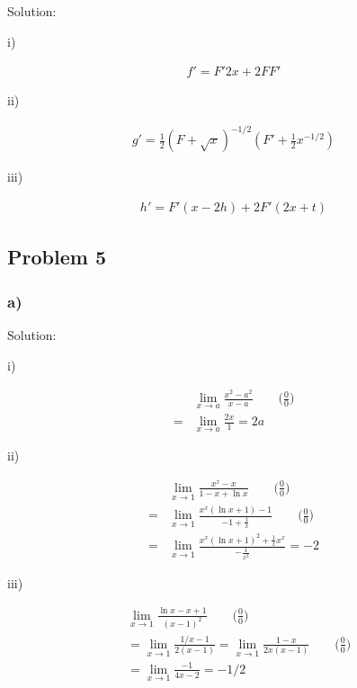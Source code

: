 \documentclass[letterpaper, 11pt]{article}
\newcommand{\1}{\mathds{1}}	%
\theoremstyle{definition}
\begin{document}
  Solution: %

  i)

  \begin{align*}
    f' = F'2x + 2FF'
  \end{align*}

  ii)

  \begin{align*}
    g' = \frac{1}{2} (F + \sqrt{x})^{-1/2} (F' + \frac{1}{2}x ^{-1/2})
  \end{align*}

  iii)

  \begin{align*}
    h' = F'(x-2h) + 2F'(2x+t)
  \end{align*}


  \subsection*{Problem 5}

  \subsubsection*{a)}

  Solution:

  i)

  \begin{align*}
      & \lim_{x \to a} \frac{x ^{2} - a ^{2}}{ x - a} \qquad\text{($\frac{0}{0}$)} \\
    = & \lim_{x \to a} \frac{2x}{1} = 2a
  \end{align*}

  ii)

  \begin{align*}
      & \lim_{x \to 1} \frac{x ^{x} -x}{1-x + \ln x} \qquad\text{($\frac{0}{0}$)}                \\
    = & \lim_{x \to 1} \frac{x ^{x}(\ln x + 1) - 1}{-1+\frac{1}{x}}\qquad\text{($\frac{0}{0}$)}  \\
    = & \lim_{x \to 1} \frac{x ^{x}(\ln x + 1)^{2} + \frac{1}{x}x ^{x}}{- \frac{1}{x ^{2}}} = -2
  \end{align*}

  iii)

  \begin{align*}
     & \lim_{x \to 1} \frac{\ln x - x + 1}{(x - 1)^{2}} \qquad\text{($\frac{0}{0}$)}                                 \\
     & = \lim_{x \to 1} \frac{1/x - 1}{2(x - 1)} = \lim_{x \to 1} \frac{1 - x}{2x(x-1)} \qquad\text{($\frac{0}{0}$)} \\
     & = \lim_{x \to 1} \frac{-1}{4x - 2} = -1/2
  \end{align*}
\end{document}
